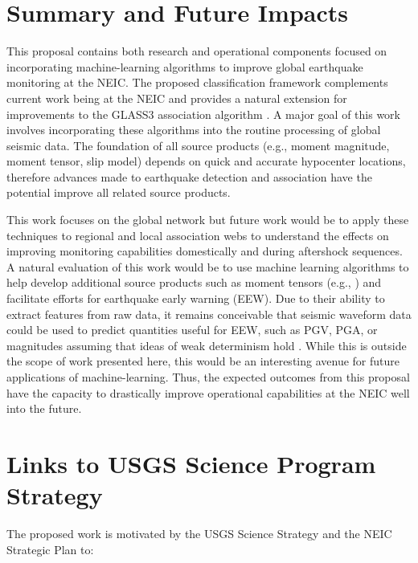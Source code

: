 \documentclass[12p]{article}
\begin{document}
\section{Summary and Future Impacts}
This proposal contains both research and operational components focused on incorporating machine-learning algorithms to
improve global earthquake monitoring at the NEIC. The proposed classification framework complements current work being
at the NEIC and provides a natural extension for improvements to the GLASS3 association algorithm \citep{Yeck2019}. A
major goal of this work involves incorporating these algorithms into the routine processing of global seismic data. The
foundation of all source products (e.g., moment magnitude, moment tensor, slip model) depends on quick and accurate
hypocenter locations, therefore advances made to earthquake detection and association have the potential improve all
related source products.

This work focuses on the global network but future work would be to apply these techniques to regional and local
association webs to understand the effects on improving monitoring capabilities domestically and during aftershock
sequences. A natural evaluation of this work would be to use machine learning algorithms to help develop additional
source products such as moment tensors (e.g., \citet{Ross2018a}) and facilitate efforts for earthquake early warning
(EEW). Due to their ability to extract features from raw data, it remains conceivable that seismic waveform data could
be used to predict quantities useful for EEW, such as PGV, PGA, or magnitudes assuming that ideas of weak determinism
hold \citep{Goldberg2018}. While this is outside the scope of work presented here, this would be an interesting avenue
for future applications of machine-learning. Thus, the expected outcomes from this proposal have the capacity to
drastically improve operational capabilities at the NEIC well into the future.

\section{Links to USGS Science Program Strategy}
The proposed work is motivated by the USGS Science Strategy \citep{Holmes2013} and the NEIC Strategic Plan \citep{Hayes2019sp} to:
\end{document}

